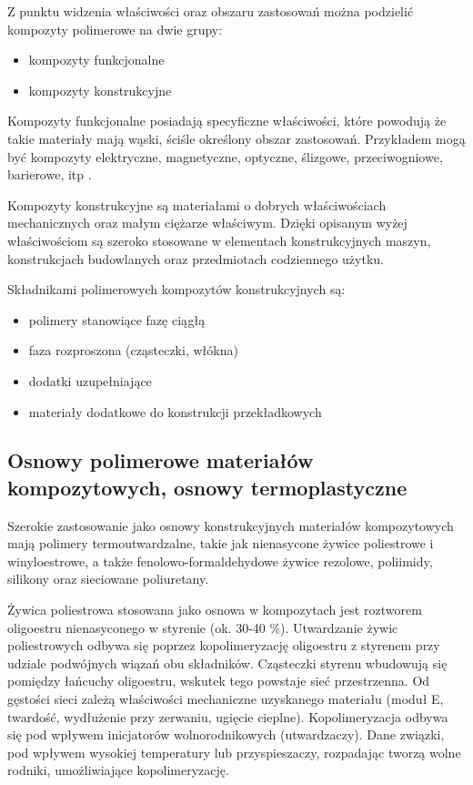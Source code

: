 \documentclass[magister,druk]{dyplom}
\begin{document}
Z punktu widzenia właściwości oraz obszaru zastosowań można podzielić kompozyty polimerowe na dwie grupy:
\begin{itemize}
	\item kompozyty funkcjonalne
	\item kompozyty konstrukcyjne
\end{itemize}

Kompozyty funkcjonalne posiadają specyficzne właściwości, które powodują że takie materiały mają wąski, ściśle określony obszar zastosowań. Przykładem mogą być kompozyty elektryczne, magnetyczne, optyczne, ślizgowe, przeciwogniowe, barierowe, itp \cite{Krolikowski2012}.
 
Kompozyty konstrukcyjne są materiałami o dobrych właściwościach mechanicznych oraz małym ciężarze właściwym. Dzięki opisanym wyżej właściwościom są szeroko stosowane w elementach konstrukcyjnych maszyn, konstrukcjach budowlanych oraz przedmiotach codziennego użytku.

Składnikami polimerowych kompozytów konstrukcyjnych są:
\begin{itemize}
	\item polimery stanowiące fazę ciągłą
	\item faza rozproszona (cząsteczki, włókna)
	\item dodatki uzupełniające
	\item materiały dodatkowe do konstrukcji przekładkowych
\end{itemize} 
 
\subsection{Osnowy polimerowe materiałów kompozytowych, osnowy termoplastyczne}

Szerokie zastosowanie jako osnowy konstrukcyjnych materiałów kompozytowych mają polimery termoutwardzalne, takie jak nienasycone żywice poliestrowe i winyloestrowe, a także fenolowo-formaldehydowe żywice rezolowe, poliimidy, silikony oraz sieciowane poliuretany\cite{Krolikowski2012}.

Żywica poliestrowa stosowana jako osnowa w kompozytach jest roztworem oligoestru nienasyconego w styrenie (ok. 30-40 \%). Utwardzanie żywic poliestrowych odbywa się poprzez kopolimeryzację oligoestru z styrenem przy udziale podwójnych wiązań obu składników. Cząsteczki styrenu wbudowują się pomiędzy łańcuchy oligoestru, wskutek tego powstaje sieć przestrzenna. Od gęstości sieci zależą właściwości mechaniczne uzyskanego materiału (moduł E, twardość, wydłużenie przy zerwaniu, ugięcie cieplne). Kopolimeryzacja odbywa się pod wpływem inicjatorów  wolnorodnikowych (utwardzaczy). Dane związki, pod wpływem wysokiej temperatury lub przyspieszaczy, rozpadając tworzą wolne rodniki, umożliwiające kopolimeryzację.
\end{document}
